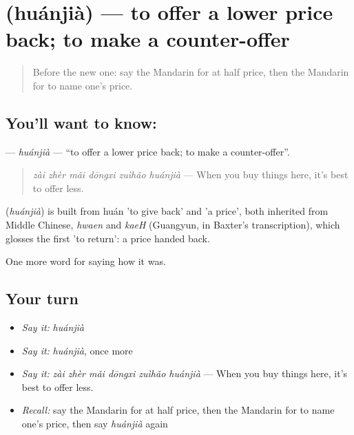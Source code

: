 \section[\texorpdfstring{\zh{还价} (huánjià)}{还价 (huánjià)}]{ (huánjià) — to offer a lower price back; to make a counter-offer}

\label{lesson:ZH-C524-huanjia}



\begin{quote}
Before the new one: say the Mandarin for at half price, then the Mandarin for to name one's price.
\end{quote}

\subsection*{You'll want to know: }
\textbf{} — \emph{huánjià} — \textquotedblleft{}to offer a lower price back; to make a counter-offer\textquotedblright{}.

\begin{quote}
\textbf{} \emph{zài zhèr mǎi dōngxi zuìhǎo huánjià} — When you buy things here, it's best to offer less.
\end{quote}

\begin{cousinweb}
\textbf{} (\emph{huánjià}) is built from  huán 'to give back' and  'a price', both inherited from Middle Chinese, \emph{hwaen} and \emph{kaeH} (Guangyun, in Baxter's transcription), which glosses the first 'to return': a price handed back.
\end{cousinweb}

\begin{grammarlens}[title={What you've built}]
One more word for saying how it was.
\end{grammarlens}

\subsection*{Your turn}
\begin{itemize}
\raggedright
  \item \emph{Say it:} \emph{huánjià}
  \item \emph{Say it:} \emph{huánjià}, once more
  \item \emph{Say it:} \emph{zài zhèr mǎi dōngxi zuìhǎo huánjià} — When you buy things here, it's best to offer less.
  \item \emph{Recall:} say the Mandarin for at half price, then the Mandarin for to name one's price, then say \emph{huánjià} again
\end{itemize}

